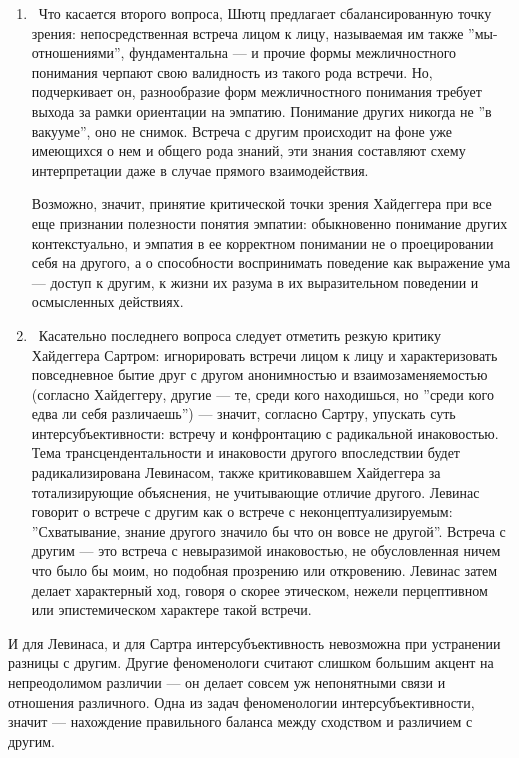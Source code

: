 \documentclass[11pt]{book}
\begin{document}
\begin{enumerate}
  \item\ Что касается второго вопроса, Шютц предлагает сбалансированную точку зрения: непосредственная встреча лицом к лицу, называемая им также ''мы-отношениями'', фундаментальна --- и прочие формы межличностного понимания черпают свою валидность из такого рода встречи. Но, подчеркивает он, разнообразие форм межличностного понимания требует выхода за рамки ориентации на эмпатию. Понимание других никогда не ''в вакууме'', оно не снимок. Встреча с другим происходит на фоне уже имеющихся о нем и общего рода знаний, эти знания составляют схему интерпретации даже в случае прямого взаимодействия.

Возможно, значит, принятие критической точки зрения Хайдеггера при все еще признании полезности понятия эмпатии: обыкновенно понимание других контекстуально, и эмпатия в ее корректном понимании не о проецировании себя на другого, а о способности воспринимать поведение как выражение ума --- доступ к другим, к жизни их разума в их выразительном поведении и осмысленных действиях.

  \item\ Касательно последнего вопроса следует отметить резкую критику Хайдеггера Сартром: игнорировать встречи лицом к лицу и характеризовать повседневное бытие друг с другом анонимностью и взаимозаменяемостью (согласно Хайдеггеру, другие --- те, среди кого находишься, но ''среди кого едва ли себя различаешь'') --- значит, согласно Сартру, упускать суть интерсубъективности: встречу и конфронтацию с радикальной инаковостью. Тема трансцендентальности и инаковости другого впоследствии будет радикализирована Левинасом, также критиковавшем Хайдеггера за тотализирующие объяснения, не учитывающие отличие другого. Левинас говорит о встрече с другим как о встрече с неконцептуализируемым: ''Схватывание, знание другого значило бы что он вовсе не другой''. Встреча с другим --- это встреча с невыразимой инаковостью, не обусловленная ничем что было бы моим, но подобная прозрению или откровению. Левинас затем делает характерный ход, говоря о скорее этическом, нежели перцептивном или эпистемическом характере такой встречи.

\end{enumerate}

И для Левинаса, и для Сартра интерсубъективность невозможна при устранении разницы с другим. Другие феноменологи считают слишком большим акцент на непреодолимом различии --- он делает совсем уж непонятными связи и отношения различного. Одна из задач феноменологии интерсубъективности, значит --- нахождение правильного баланса между сходством и различием с другим.
\end{document}
